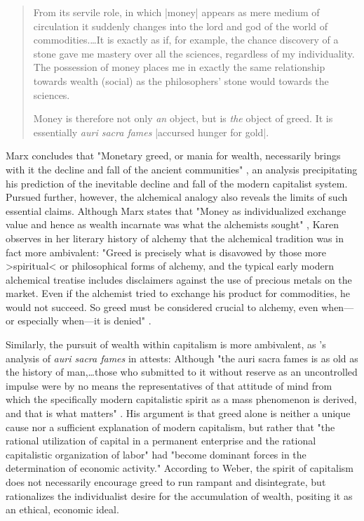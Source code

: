 \blockcquote[221--2]{MarxGrundrisse}{
  From its servile role, in which |money| appears as mere medium of circulation it suddenly changes into the lord and god of the world of commodities.…It is exactly as if, for example, the chance discovery of a stone gave me mastery over all the sciences, regardless of my individuality. The possession of money places me in exactly the same relationship towards wealth (social) as the philosophers' stone would towards the sciences.

  Money is therefore not only \emph{an} object, but is \emph{the} object of greed. It is essentially \emph{auri sacra fames} |accursed hunger for gold|.
}
Marx concludes that "Monetary greed, or mania for wealth, necessarily brings with it the decline and fall of the ancient communities" \autocite[223]{MarxGrundrisse}, an analysis precipitating his prediction of the inevitable decline and fall of the modern capitalist system. Pursued further, however, the alchemical analogy also reveals the limits of such essential claims. Although Marx states that "Money as individualized exchange value and hence as wealth incarnate was what the alchemists sought" \autocite[225]{MarxGrundrisse}, Karen \citeauthor{PinkusAlchemical} observes in her literary history of alchemy that the alchemical tradition was in fact more ambivalent: "Greed is precisely what is disavowed by those more >spiritual< or philosophical forms of alchemy, and the typical early modern alchemical treatise includes disclaimers against the use of precious metals on the market. Even if the alchemist tried to exchange his product for commodities, he would not succeed. So greed must be considered crucial to alchemy, even when---or especially when---it is denied" \autocite[10]{PinkusAlchemical}.

Similarly, the pursuit of wealth within capitalism is more ambivalent, as \citeauthor{WeberPE}'s analysis of \emph{auri sacra fames} in  attests: Although "the auri sacra fames is as old as the history of man,…those who submitted to it without reserve as an uncontrolled impulse were by no means the representatives of that attitude of mind from which the specifically modern capitalistic spirit as a mass phenomenon is derived, and that is what matters" \autocite[ch.~2]{WeberPE}. His argument is that greed alone is neither a unique cause nor a sufficient explanation of modern capitalism, but rather that "the rational utilization of capital in a permanent enterprise and the rational capitalistic organization of labor" had "become dominant forces in the determination of economic activity." According to Weber, the spirit of capitalism does not necessarily encourage greed to run rampant and disintegrate, but rationalizes the individualist desire for the accumulation of wealth, positing it as an ethical, economic ideal.

